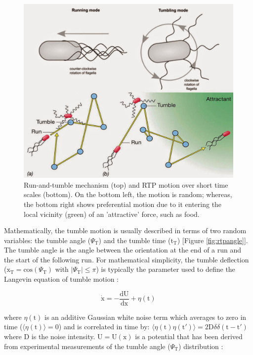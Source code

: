 \documentclass[11pt]{article}
\begin{document}
\begin{figure}[ht]
\centering\includegraphics[width=0.8\linewidth]{2-run.jpg}
\caption{Run-and-tumble mechanism (top) and RTP motion over short time scales (bottom). On the bottom left, the motion is random; whereas, the bottom right shows preferential motion due to it entering the local vicinity (green) of an 'attractive' force, such as food.}
\label{fig:rtp}
\end{figure}

Mathematically, the tumble motion is usually described in terms of two random variables: the tumble angle ($\Psi_\text{T}$) and the tumble time ($\text{t}_\text{T}$) [Figure \ref{fig:rtpangle}]. The tumble angle is the angle between the orientation at the end of a run and the start of the following run. For mathematical simplicity, the tumble deflection ($\text{x}_\text{T}=\text{cos}(\Psi_\text{T})$ with $|\Psi_\text{T}|\le\pi$) is typically the parameter used to define the Langevin equation of tumble motion \cite{Fier2}:

\begin{equation}\label{deflection2}
    \dot{\text{x}} = -\frac{\text{dU}}{\text{dx}}+\eta(\text{t})
\end{equation}

\noindent where $\eta(\text{t})$ is an additive Gaussian white noise term which averages to zero in time ($\langle\eta(\text{t})\rangle=0$) and is correlated in time by: $\langle\eta(\text{t})\eta(\text{t}')\rangle=2\text{D}\delta\delta(\text{t}-\text{t}')$ where D is the noise intensity.  $\text{U}=\text{U}(\text{x})$ is a potential that has been derived from experimental measurements of the tumble angle ($\Psi_\text{T}$) distribution \cite{Fier}:
\end{document}
